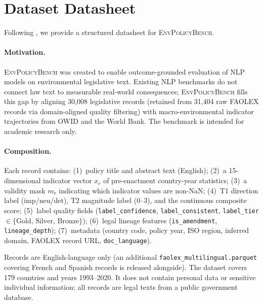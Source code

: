 \documentclass[11pt]{article}
\newcommand{\bench}{\textsc{EnvPolicyBench}}
\begin{document}
\section{Dataset Datasheet}
\label{app:datasheet}

Following \citet{gebru2021datasheets}, we provide a structured datasheet
for \bench.

\paragraph{Motivation.}
\bench{} was created to enable outcome-grounded evaluation of NLP models on
environmental legislative text. Existing NLP benchmarks do not connect law text
to measurable real-world consequences; \bench{} fills this gap by aligning
30{,}008 legislative records (retained from 31{,}404 raw FAOLEX records via
domain-aligned quality filtering) with macro-environmental indicator
trajectories from OWID and the World Bank.
The benchmark is intended for academic research only.

\paragraph{Composition.}
Each record contains: (1)~policy title and abstract text (English); (2)~a
15-dimensional indicator vector $x_r$ of pre-enactment country-year statistics;
(3)~a validity mask $m_r$ indicating which indicator values are non-NaN;
(4)~T1 direction label (\textsf{imp}/\textsf{neu}/\textsf{det}), T2 magnitude
label (0--3), and the continuous composite score; (5)~label quality fields
(\texttt{label\_confidence}, \texttt{label\_consistent},
\texttt{label\_tier} $\in\{\text{Gold, Silver, Bronze}\}$);
(6)~legal lineage features (\texttt{is\_amendment}, \texttt{lineage\_depth});
(7)~metadata (country code, policy year, ISO region, inferred domain,
FAOLEX record URL, \texttt{doc\_language}).

Records are English-language only (an additional \texttt{faolex\_multilingual.parquet}
covering French and Spanish records is released alongside). The dataset covers 179 countries and
years 1993--2020. It does not contain personal data or sensitive individual
information; all records are legal texts from a public government database.
\end{document}
